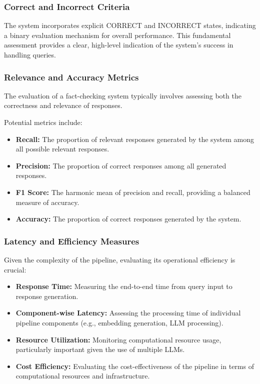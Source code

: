 \subsubsection{Correct and Incorrect Criteria}
The system incorporates explicit CORRECT and INCORRECT states, indicating a binary evaluation mechanism for overall performance.
This fundamental assessment provides a clear, high-level indication of the system's success in handling queries.
\subsubsection{Relevance and Accuracy Metrics}
The evaluation of a fact-checking system typically involves assessing both the correctness and relevance of responses.

Potential metrics include:
\begin{itemize}
    \item \textbf{Recall:} The proportion of relevant responses generated by the system among all possible relevant responses.
    \item \textbf{Precision:} The proportion of correct responses among all generated responses.
    \item \textbf{F1 Score:} The harmonic mean of precision and recall, providing a balanced measure of accuracy.
    \item \textbf{Accuracy:} The proportion of correct responses generated by the system.
\end{itemize}
\subsubsection{Latency and Efficiency Measures}
Given the complexity of the pipeline, evaluating its operational efficiency is crucial:
\begin{itemize}
    \item \textbf{Response Time:} Measuring the end-to-end time from query input to response generation.
    \item \textbf{Component-wise Latency:} Assessing the processing time of individual pipeline components (e.g., embedding generation, LLM processing).
    \item \textbf{Resource Utilization:} Monitoring computational resource usage, particularly important given the use of multiple LLMs.
    \item \textbf{Cost Efficiency:} Evaluating the cost-effectiveness of the pipeline in terms of computational resources and infrastructure.
\end{itemize}
